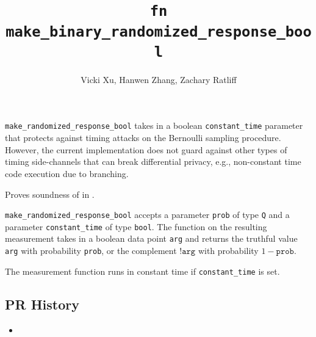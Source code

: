 \documentclass{article}
\title{\texttt{fn make\_binary\_randomized\_response\_bool}}
\author{Vicki Xu, Hanwen Zhang, Zachary Ratliff}
\begin{document}
\maketitle

\contrib
\begin{tcolorbox}
    \begin{warning}
        \texttt{make\_randomized\_response\_bool} takes in a boolean \texttt{constant\_time} parameter that protects against timing attacks on the Bernoulli sampling procedure. However, the current implementation does not guard against other types of timing side-channels that can break differential privacy, e.g., non-constant time code execution due to branching.
    \end{warning}
\end{tcolorbox}

Proves soundness of  in .

\texttt{make\_randomized\_response\_bool} accepts a parameter \texttt{prob} of type \texttt{Q} and a parameter \texttt{constant\_time} of type \texttt{bool}.
The function on the resulting measurement takes in a boolean data point \texttt{arg} and returns the truthful value \texttt{arg} with probability \texttt{prob},
or the complement $\texttt{!arg}$ with probability $1 - \texttt{prob}$.

The measurement function runs in constant time if \texttt{constant\_time} is set. 

\subsection*{PR History}
\begin{itemize}
    \item {}
\end{itemize}

\end{document}
